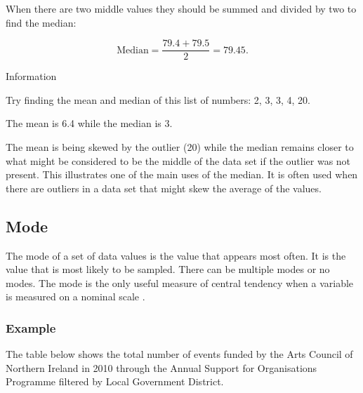 \documentclass[
]{book}
\begin{document}
When there are two middle values they should be summed and divided by two to find the median:

\[\textrm{Median} =\frac{79.4+79.5}{2}=79.45.\]

Information

Try finding the mean and median of this list of numbers: 2, 3, 3, 4, 20.

The mean is 6.4 while the median is 3.

The mean is being skewed by the outlier (20) while the median remains closer to what might be considered to be the middle of the data set if the outlier was not present. This illustrates one of the main uses of the median. It is often used when there are outliers in a data set that might skew the average of the values.

\hypertarget{mode}{%
\subsection{Mode}\label{mode}}

The mode of a set of data values is the value that appears most often. It is the value that is most likely to be sampled. There can be multiple modes or no modes. The mode is the only useful measure of central tendency when a variable is measured on a nominal scale \citep{mchugh3}.

\hypertarget{example-3}{%
\subsubsection{Example}\label{example-3}}

The table below shows the total number of events funded by the Arts Council of Northern Ireland in 2010 through the Annual Support for Organisations Programme \citep{nisra13} filtered by Local Government District.
\end{document}
